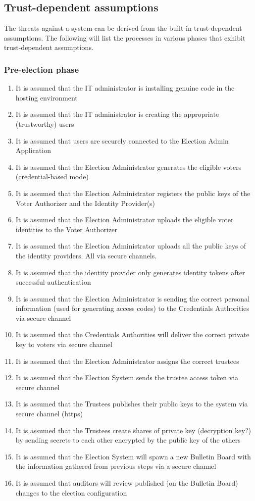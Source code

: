 \subsection{Trust-dependent assumptions} 
The threats against a system can be derived from the built-in trust-dependent assumptions. The following will list the processes in various phases that exhibit trust-dependent assumptions.


\subsubsection{Pre-election phase} 

\begin{enumerate}
\item It is assumed that the IT administrator is installing genuine code in the hosting environment
\item It is assumed that the IT administrator is creating the appropriate (trustworthy) users
\item It is assumed that users are securely connected to the Election Admin Application
\item It is assumed that the Election Administrator generates the eligible voters (credential-based mode)
\item It is assumed that the Election Administrator registers the public keys of the Voter Authorizer and the Identity Provider(s)
\item It is assumed that the Election Administrator uploads the eligible voter identities to the Voter Authorizer
\item It is assumed that the Election Administrator uploads all the public keys of the identity providers. All via secure channels.
\item It is assumed that the identity provider only generates identity tokens after successful authentication
\item It is assumed that the Election Administrator is sending the correct personal information (used for generating access codes) to the Credentials Authorities via secure channel
\item It is assumed that the Credentials Authorities will deliver the correct private key to voters via secure channel
\item It is assumed that the Election Administrator assigns the correct trustees
\item It is assumed that the Election System sends the trustee access token via secure channel
\item It is assumed that the Trustees publishes their public keys to the system via secure channel (https)
\item It is assumed that the Trustees create shares of private key (decryption key?) by sending secrets to each other encrypted by the public key of the others
\item It is assumed that the Election System will spawn a new Bulletin Board with the information gathered from previous steps via a secure channel
\item It is assumed that auditors will review published (on the Bulletin Board) changes to the election configuration
\end{enumerate}


